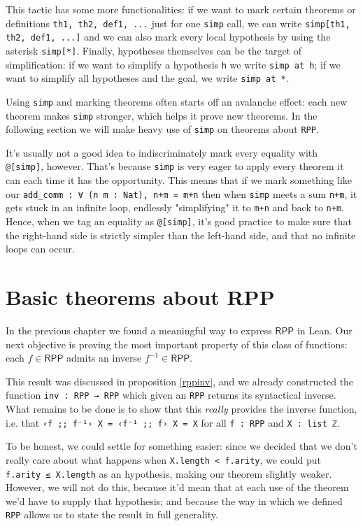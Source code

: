 \documentclass{book}
\theoremstyle{definition}
\theoremstyle{remark}
\theoremstyle{plain}
\newcommand{\RPP}{\mathsf{RPP}}
\begin{document}
This tactic has some more functionalities: if we want to mark certain theorems or definitions \lstinline{th1, th2, def1, ...}
just for one \lstinline{simp} call, we can write \lstinline{simp[th1, th2, def1, ...]} and we can also mark every local hypothesis
by using the asterisk \lstinline{simp[*]}.
Finally, hypotheses themselves can be the target of simplification:
if we want to simplify a hypothesis \lstinline{h} we write \lstinline{simp at h};
if we want to simplify all hypotheses and the goal, we write \lstinline{simp at *}.

Using \lstinline{simp} and marking theorems often starts off an avalanche effect:
each new theorem makes \lstinline{simp} stronger, which helps it prove new theorems.
In the following section we will make heavy use of \lstinline{simp} on theorems about \lstinline{RPP}.

It's usually not a good idea to indiscriminately mark every equality with \lstinline{@[simp]}, however.
That's because \lstinline{simp} is very eager to apply every theorem it can each time it has the opportunity.
This means that if we mark something like our \lstinline{add_comm : ∀ (n m : Nat), n+m = m+n}
then when \lstinline{simp} meets a sum \lstinline{n+m}, it gets stuck in an infinite loop,
endlessly "simplifying" it to \lstinline{m+n} and back to \lstinline{n+m}.
Hence, when we tag an equality as \lstinline{@[simp]},
it's good practice to make sure that the right-hand side is strictly simpler than the left-hand side,
and that no infinite loops can occur.

\section{Basic theorems about RPP}

In the previous chapter we found a meaningful way to express $\RPP$ in Lean.
Our next objective is proving the most important property of this class of functions:
each $f \in \RPP$ admits an inverse $f^{-1} \in \RPP$.

This result was discussed in proposition \ref{rppinv},
and we already constructed the function \lstinline{inv : RPP → RPP} which given an \lstinline{RPP} returns its syntactical inverse.
What remains to be done is to show that this \textit{really} provides the inverse function,
i.e. that \lstinline{‹f ;; f⁻¹› X = ‹f⁻¹ ;; f› X = X} for all \lstinline{f : RPP} and \lstinline{X : list ℤ}.

To be honest, we could settle for something easier:
since we decided that we don't really care about what happens when \lstinline{X.length < f.arity},
we could put \lstinline{f.arity ≤ X.length} as an hypothesis, making our theorem slightly weaker.
However, we will not do this, because it'd mean that at each use of the theorem we'd have to supply that hypothesis;
and because the way in which we defined \lstinline{RPP} allows us to state the result in full generality.
\end{document}

